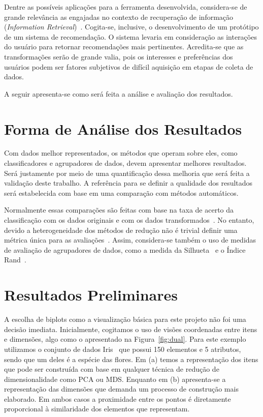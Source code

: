 Dentre as possíveis aplicações para a ferramenta
desenvolvida, considera-se de grande relevância as
engajadas no contexto de recuperação de informação
(\emph{Information Retrieval})~\cite{Manning2008}.
Cogita-se, inclusive, o desenvolvimento de um protótipo de um
sistema de recomendação. O sistema levaria em consideração
as interações do usuário para retornar recomendações mais
pertinentes. Acredita-se que as transformações serão de
grande valia, pois os interesses e preferências dos usuários
podem ser fatores subjetivos de difícil aquisição em etapas
de coleta de dados.

A seguir apresenta-se como será feita a análise e avaliação
dos resultados.

\section{Forma de Análise dos Resultados}

Com dados melhor representados, os métodos que operam sobre
eles, como classificadores e agrupadores de dados, devem
apresentar melhores resultados. Será justamente por meio de uma
quantificação dessa melhoria que será feita a validação 
deste trabalho. A referência para se definir a qualidade dos
resultados será estabelecida com base em uma comparação com
métodos automáticos.

Normalmente essas comparações são feitas com base na taxa de
acerto da classificação com os dados originais e com os
dados transformados~\cite{Guyon2003,Joshi2007}. No entanto,
devido a heterogeneidade dos métodos de redução não é
trivial definir uma métrica única para as
avaliações~\cite{Medeiros2011}. Assim, considera-se também o
uso de medidas de avaliação de agrupadores de dados, como a
medida da Silhueta~\cite{Rousseeuw1987} e o Índice
Rand~\cite{Rand1971}.

\section{Resultados Preliminares}

A escolha de biplots como a visualização básica para este
projeto não foi uma decisão imediata. Inicialmente,
cogitamos o uso de visões coordenadas entre itens e
dimensões, algo como o apresentado na Figura~\ref{fig:dual}.
Para este exemplo utilizamos o conjunto de dados
Iris~\cite{Fisher1936} que possui 150 elementos e 5
atributos, sendo que um deles é a espécie das flores. Em
(a) temos a representação dos itens que pode ser construída
com base em qualquer técnica de redução de dimensionalidade
como PCA ou MDS. Enquanto em (b) apresenta-se a representação das
dimensões que demanda um processo de construção mais
elaborado. Em ambos casos a proximidade entre os
pontos é diretamente proporcional à similaridade dos
elementos que representam.

